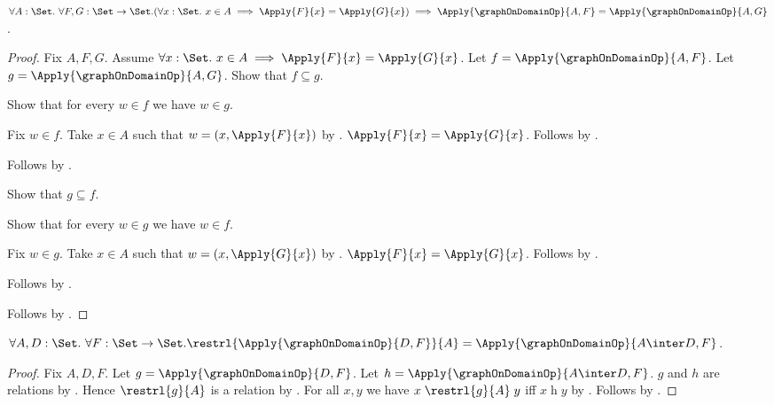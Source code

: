 \begin{proposition}\label{logical_graph_on_domain_extensional}
    $\forall A:\Set.\ \forall F,G:\Set\to\Set.
        (\forall x:\Set.\ x\in A\implies
            \Apply{F}{x}=\Apply{G}{x})
        \implies
        \Apply{\graphOnDomainOp}{A,F}
            =\Apply{\graphOnDomainOp}{A,G}$.
\end{proposition}
\begin{proof}
    Fix $A,F,G$.
    Assume $\forall x:\Set.\ x\in A\implies
        \Apply{F}{x}=\Apply{G}{x}$.
    Let $f=\Apply{\graphOnDomainOp}{A,F}$.
    Let $g=\Apply{\graphOnDomainOp}{A,G}$.
    Show that $f\subseteq g$.
    \begin{subproof}
        Show that for every $w\in f$ we have $w\in g$.
        \begin{subproof}
            Fix $w\in f$.
            Take $x\in A$ such that $w=(x,\Apply{F}{x})$
                by .
            $\Apply{F}{x}=\Apply{G}{x}$.
            Follows by .
        \end{subproof}
        Follows by .
    \end{subproof}
    Show that $g\subseteq f$.
    \begin{subproof}
        Show that for every $w\in g$ we have $w\in f$.
        \begin{subproof}
            Fix $w\in g$.
            Take $x\in A$ such that $w=(x,\Apply{G}{x})$
                by .
            $\Apply{F}{x}=\Apply{G}{x}$.
            Follows by .
        \end{subproof}
        Follows by .
    \end{subproof}
    Follows by .
\end{proof}

\begin{proposition}\label{logical_graph_on_domain_restrl}
    $\forall A,D:\Set.\ \forall F:\Set\to\Set.
        \restrl{\Apply{\graphOnDomainOp}{D,F}}{A}
            =\Apply{\graphOnDomainOp}{A\inter D,F}$.
\end{proposition}
\begin{proof}
    Fix $A,D,F$.
    Let $g=\Apply{\graphOnDomainOp}{D,F}$.
    Let $h=\Apply{\graphOnDomainOp}{A\inter D,F}$.
    $g$ and $h$ are relations by
        .
    Hence $\restrl{g}{A}$ is a relation by
        .
    For all $x,y$ we have
        $x\mathrel{\restrl{g}{A}}y$ iff $x\mathrel{h}y$
        by .
    Follows by .
\end{proof}

